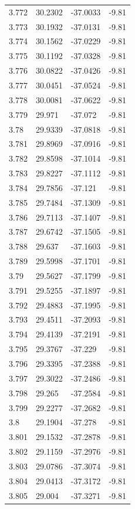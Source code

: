 \begin{tabular}{llll}
3.772 & 30.2302 & -37.0033 & -9.81 \\
3.773 & 30.1932 & -37.0131 & -9.81 \\
3.774 & 30.1562 & -37.0229 & -9.81 \\
3.775 & 30.1192 & -37.0328 & -9.81 \\
3.776 & 30.0822 & -37.0426 & -9.81 \\
3.777 & 30.0451 & -37.0524 & -9.81 \\
3.778 & 30.0081 & -37.0622 & -9.81 \\
3.779 & 29.971 & -37.072 & -9.81 \\
3.78 & 29.9339 & -37.0818 & -9.81 \\
3.781 & 29.8969 & -37.0916 & -9.81 \\
3.782 & 29.8598 & -37.1014 & -9.81 \\
3.783 & 29.8227 & -37.1112 & -9.81 \\
3.784 & 29.7856 & -37.121 & -9.81 \\
3.785 & 29.7484 & -37.1309 & -9.81 \\
3.786 & 29.7113 & -37.1407 & -9.81 \\
3.787 & 29.6742 & -37.1505 & -9.81 \\
3.788 & 29.637 & -37.1603 & -9.81 \\
3.789 & 29.5998 & -37.1701 & -9.81 \\
3.79 & 29.5627 & -37.1799 & -9.81 \\
3.791 & 29.5255 & -37.1897 & -9.81 \\
3.792 & 29.4883 & -37.1995 & -9.81 \\
3.793 & 29.4511 & -37.2093 & -9.81 \\
3.794 & 29.4139 & -37.2191 & -9.81 \\
3.795 & 29.3767 & -37.229 & -9.81 \\
3.796 & 29.3395 & -37.2388 & -9.81 \\
3.797 & 29.3022 & -37.2486 & -9.81 \\
3.798 & 29.265 & -37.2584 & -9.81 \\
3.799 & 29.2277 & -37.2682 & -9.81 \\
3.8 & 29.1904 & -37.278 & -9.81 \\
3.801 & 29.1532 & -37.2878 & -9.81 \\
3.802 & 29.1159 & -37.2976 & -9.81 \\
3.803 & 29.0786 & -37.3074 & -9.81 \\
3.804 & 29.0413 & -37.3172 & -9.81 \\
3.805 & 29.004 & -37.3271 & -9.81 \\

\end{tabular}
